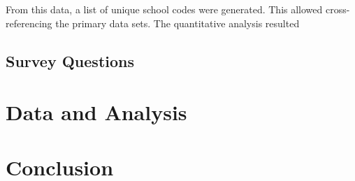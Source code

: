 \documentclass[twocolumn,english]{IEEEtran}
\theoremstyle{plain}
\theoremstyle{plain}
\begin{document}
From this data, a list of unique school codes were generated. This allowed cross-referencing the primary data sets.
The quantitative analysis resulted 


\subsection{Survey Questions}

\section{Data and Analysis}





\section{Conclusion}



%
%
\end{document}
